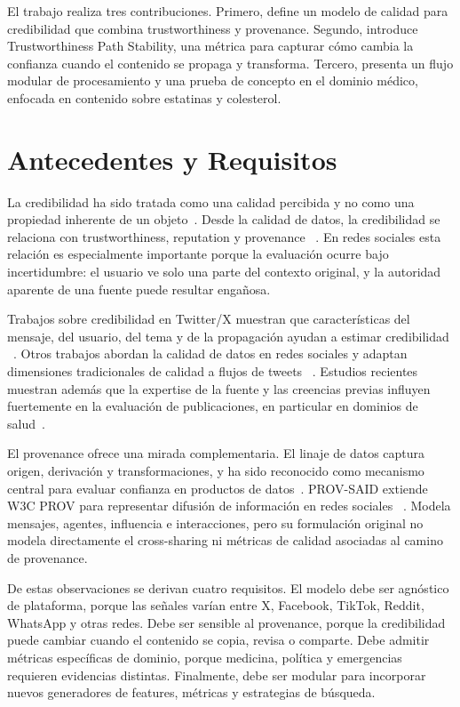 \documentclass[sigconf, nonacm]{acmart}
\begin{document}
El trabajo realiza tres contribuciones. Primero, define un modelo de calidad para
credibilidad que combina trustworthiness y provenance. Segundo, introduce
Trustworthiness Path Stability, una m\'etrica para capturar c\'omo cambia la
confianza cuando el contenido se propaga y transforma. Tercero, presenta un flujo
modular de procesamiento y una prueba de concepto en el dominio m\'edico, enfocada
en contenido sobre estatinas y colesterol.

\section{Antecedentes y Requisitos}

La credibilidad ha sido tratada como una calidad percibida y no como una propiedad
inherente de un objeto~\cite{FoggTseng1999}. Desde la calidad de datos, la
credibilidad se relaciona con trustworthiness, reputation y provenance
~\cite{BatiniScannapieco2016}. En redes sociales esta relaci\'on es especialmente
importante porque la evaluaci\'on ocurre bajo incertidumbre: el usuario ve solo una
parte del contexto original, y la autoridad aparente de una fuente puede resultar
enga\~nosa.

Trabajos sobre credibilidad en Twitter/X muestran que caracter\'isticas del mensaje,
del usuario, del tema y de la propagaci\'on ayudan a estimar credibilidad
~\cite{Castillo2011}. Otros trabajos abordan la calidad de datos en redes sociales
y adaptan dimensiones tradicionales de calidad a flujos de tweets
~\cite{Arolfo2020}. Estudios recientes muestran adem\'as que la expertise de la
fuente y las creencias previas influyen fuertemente en la evaluaci\'on de
publicaciones, en particular en dominios de salud~\cite{Kuutila2024}.

El provenance ofrece una mirada complementaria. El linaje de datos captura origen,
derivaci\'on y transformaciones, y ha sido reconocido como mecanismo central para
evaluar confianza en productos de datos~\cite{Simmhan2005}. PROV-SAID extiende
W3C PROV para representar difusi\'on de informaci\'on en redes sociales
~\cite{Taxidou2015}. Modela mensajes, agentes, influencia e interacciones, pero su
formulaci\'on original no modela directamente el cross-sharing ni m\'etricas de
calidad asociadas al camino de provenance.

De estas observaciones se derivan cuatro requisitos. El modelo debe ser agn\'ostico
de plataforma, porque las se\~nales var\'ian entre X, Facebook, TikTok, Reddit,
WhatsApp y otras redes. Debe ser sensible al provenance, porque la credibilidad
puede cambiar cuando el contenido se copia, revisa o comparte. Debe admitir
m\'etricas espec\'ificas de dominio, porque medicina, pol\'itica y emergencias
requieren evidencias distintas. Finalmente, debe ser modular para incorporar nuevos
generadores de features, m\'etricas y estrategias de b\'usqueda.
\end{document}
